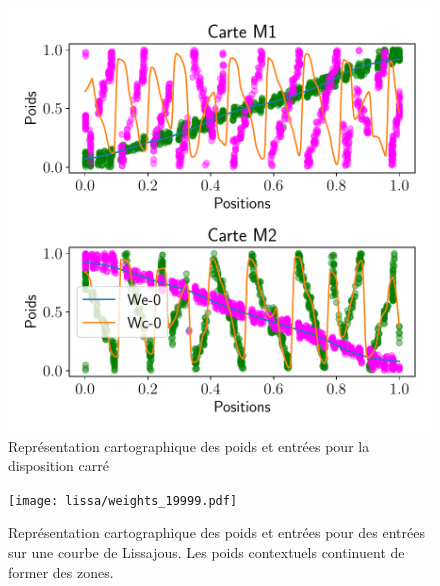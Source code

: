 \documentclass[../main]{subfiles}
\begin{document}
\begin{figure}
	\centering\includegraphics[width=\textwidth]{2som_square_w.pdf}
	\caption{Représentation cartographique des poids et entrées pour la disposition carré}
\end{figure}

\begin{figure}
	\centering\texttt{[image: lissa/weights\_19999.pdf]}
	\caption{Représentation cartographique des poids et entrées pour des entrées sur une courbe de Lissajous. Les poids contextuels continuent de former des zones.}
\end{figure}
\end{document}

